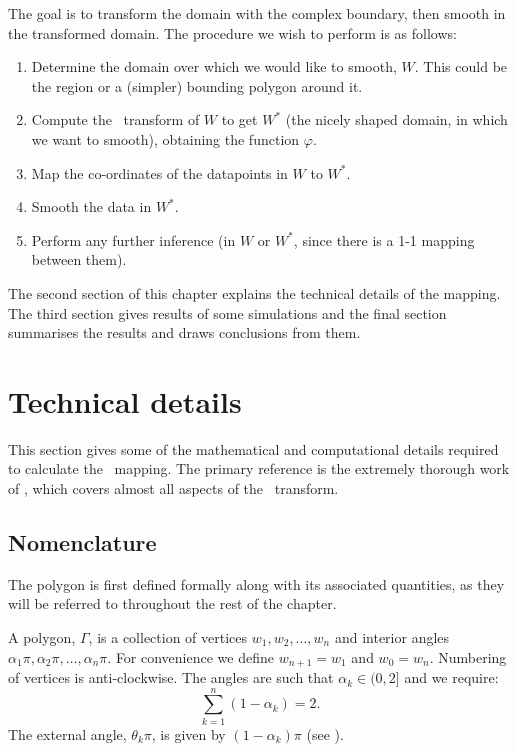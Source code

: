 The goal is to transform the domain with the complex boundary, then smooth in the transformed domain. The procedure we wish to perform is as follows:

\begin{enumerate}
\item Determine the domain over which we would like to smooth, $W$. This could be the region or a (simpler) bounding polygon around it.

\item Compute the \sch\ transform of $W$ to get $W^*$ (the nicely shaped domain, in which we want to smooth), obtaining the function $\varphi$.

\item Map the co-ordinates of the datapoints in $W$ to $W^*$.

\item Smooth the data in $W^*$.

\item Perform any further inference (in $W$ or $W^*$, since there is a 1-1 mapping between them).
\end{enumerate}

The second section of this chapter explains the technical details of the mapping. The third section gives results of some simulations and the final section summarises the results and draws conclusions from them.

\section{Technical details}

This section gives some of the mathematical and computational details required to calculate the \sch\ mapping. The primary reference is the extremely thorough work of \cite{driscoll}, which covers almost all aspects of the \sch\ transform.

\subsection{Nomenclature}

The polygon is first defined formally along with its associated quantities, as they will be referred to throughout the rest of the chapter.

A polygon, $\Gamma$, is a collection of vertices $w_1, w_2,\dots,w_n$ and interior angles $\alpha_1\pi, \alpha_2\pi, \dots, \alpha_n\pi$. For convenience we define $w_{n+1} = w_1$ and $w_0=w_n$. Numbering of vertices is anti-clockwise. The angles are such that $\alpha_k \in (0,2]$ and we require:
\begin{equation}
\sum_{k=1}^n (1-\alpha_k) = 2.
\end{equation}
The external angle, $\theta_k\pi$, is given by $(1-\alpha_k)\pi$ (see ).

